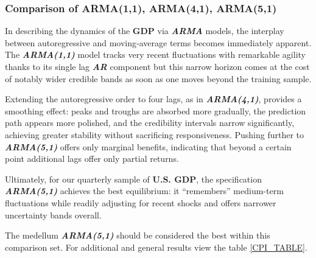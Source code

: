 \documentclass{Configuration_Files/PoliMi3i_thesis}
\begin{document}
\newpage
\subsubsection*{Comparison of ARMA(1,1), ARMA(4,1), ARMA(5,1)}
In describing the dynamics of the \textbf{GDP} via \textbf{\textit{ARMA}} models, the interplay between autoregressive and moving‐average terms becomes immediately apparent. The \textbf{\textit{ARMA(1,1)}} model tracks very recent fluctuations with remarkable agility thanks to its single lag \textbf{\textit{AR}} component but this narrow horizon comes at the cost of notably wider credible bands as soon as one moves beyond the training sample. 

Extending the autoregressive order to four lags, as in \textbf{\textit{ARMA(4,1)}}, provides a smoothing effect: peaks and troughs are absorbed more gradually, the prediction path appears more polished, and the credibility intervals narrow significantly, achieving greater stability without sacrificing responsiveness. Pushing further to \textbf{\textit{ARMA(5,1)}} offers only marginal benefits, indicating that beyond a certain point additional lags offer only partial returns.

Ultimately, for our quarterly sample of \textbf{U.S. GDP}, the specification \textbf{\textit{ARMA(5,1)}} achieves the best equilibrium: it “remembers” medium-term fluctuations while readily adjusting for recent shocks and offers narrower uncertainty bands overall.

The medellum \textbf{\textit{ARMA(5,1)}} should be considered the best within this comparison set. For additional and general results view the table \ref{CPI_TABLE}.
\end{document}
